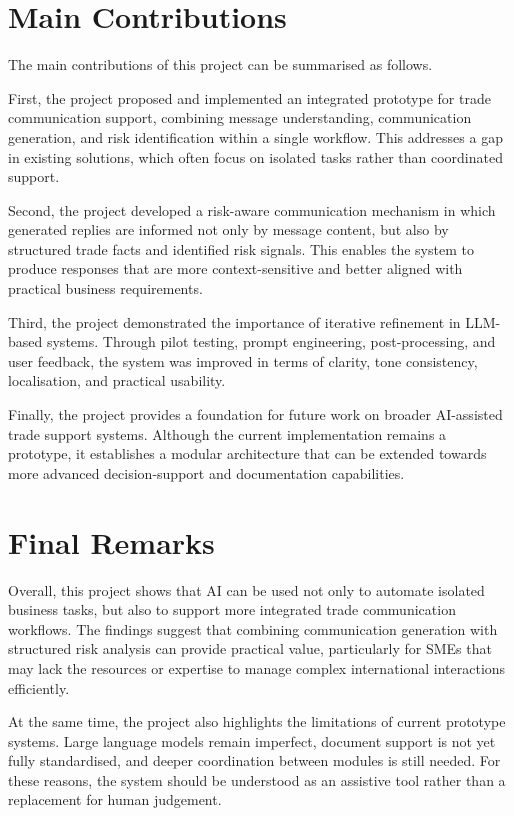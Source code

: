\documentclass[12pt,a4paper]{report}
\begin{document}
\section{Main Contributions}

The main contributions of this project can be summarised as follows.

First, the project proposed and implemented an integrated prototype for trade communication support, combining message understanding, communication generation, and risk identification within a single workflow. This addresses a gap in existing solutions, which often focus on isolated tasks rather than coordinated support.

Second, the project developed a risk-aware communication mechanism in which generated replies are informed not only by message content, but also by structured trade facts and identified risk signals. This enables the system to produce responses that are more context-sensitive and better aligned with practical business requirements.

Third, the project demonstrated the importance of iterative refinement in LLM-based systems. Through pilot testing, prompt engineering, post-processing, and user feedback, the system was improved in terms of clarity, tone consistency, localisation, and practical usability.

Finally, the project provides a foundation for future work on broader AI-assisted trade support systems. Although the current implementation remains a prototype, it establishes a modular architecture that can be extended towards more advanced decision-support and documentation capabilities.

\section{Final Remarks}

Overall, this project shows that AI can be used not only to automate isolated business tasks, but also to support more integrated trade communication workflows. The findings suggest that combining communication generation with structured risk analysis can provide practical value, particularly for SMEs that may lack the resources or expertise to manage complex international interactions efficiently.

At the same time, the project also highlights the limitations of current prototype systems. Large language models remain imperfect, document support is not yet fully standardised, and deeper coordination between modules is still needed. For these reasons, the system should be understood as an assistive tool rather than a replacement for human judgement.
\end{document}
